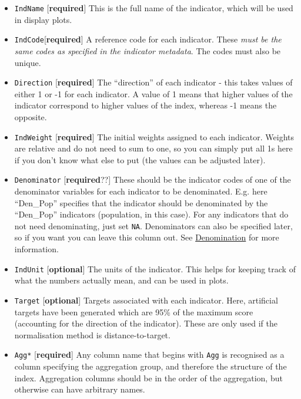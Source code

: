 \documentclass[
]{book}
\providecommand{\tightlist}{%
  \setlength{\itemsep}{0pt}\setlength{\parskip}{0pt}}
\begin{document}
\begin{itemize}
\tightlist
\item
  \texttt{IndName} {[}\textbf{required}{]} This is the full name of the indicator, which will be used in display plots.
\item
  \texttt{IndCode}{[}\textbf{required}{]} A reference code for each indicator. These \emph{must be the same codes as specified in the indicator metadata}. The codes must also be unique.
\item
  \texttt{Direction} {[}\textbf{required}{]} The ``direction'' of each indicator - this takes values of either 1 or -1 for each indicator. A value of 1 means that higher values of the indicator correspond to higher values of the index, whereas -1 means the opposite.
\item
  \texttt{IndWeight} {[}\textbf{required}{]} The initial weights assigned to each indicator. Weights are relative and do not need to sum to one, so you can simply put all 1s here if you don't know what else to put (the values can be adjusted later).
\item
  \texttt{Denominator} {[}\textbf{required}??{]} These should be the indicator codes of one of the denominator variables for each indicator to be denominated. E.g. here ``Den\_Pop'' specifies that the indicator should be denominated by the ``Den\_Pop'' indicators (population, in this case). For any indicators that do not need denominating, just set \texttt{NA}. Denominators can also be specified later, so if you want you can leave this column out. See \protect\hyperlink{denomination-1}{Denomination} for more information.
\item
  \texttt{IndUnit} {[}\textbf{optional}{]} The units of the indicator. This helps for keeping track of what the numbers actually mean, and can be used in plots.
\item
  \texttt{Target} {[}\textbf{optional}{]} Targets associated with each indicator. Here, artificial targets have been generated which are 95\% of the maximum score (accounting for the direction of the indicator). These are only used if the normalisation method is distance-to-target.
\item
  \texttt{Agg*} {[}\textbf{required}{]} Any column name that begins with \texttt{Agg} is recognised as a column specifying the aggregation group, and therefore the structure of the index. Aggregation columns should be in the order of the aggregation, but otherwise can have arbitrary names.
\end{itemize}
\end{document}
